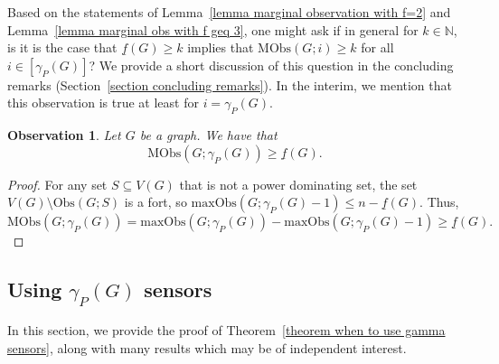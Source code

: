 \documentclass{article}
\newtheorem{observation}[theorem]{Observation}
\begin{document}
        Based on the statements of Lemma~\ref{lemma marginal observation with f=2} and Lemma~\ref{lemma marginal obs with f geq 3}, one might ask if in general for $k\in\mathbb{N}$, is it is the case that $\underline{f}(G)\geq k$ implies that $\mathrm{MObs}(G;i)\geq k$ for all $i\in [\gamma_P(G)]$?
        We provide a short discussion of this question in the concluding remarks (Section~\ref{section concluding remarks}).
        In the interim, we mention that this observation is true at least for $i=\gamma_P(G)$.
        \begin{observation}\label{observation marginal obs for gamma is minimal fort}
            Let $G$ be a graph.
            We have that
                \[ \mathrm{MObs}(G;\gamma_P(G))\geq \underline{f}(G). \]
        \end{observation}
        \begin{proof}
            For any set $S\subseteq V(G)$ that is not a power dominating set, the set $V(G)\setminus \mathrm{Obs}(G;S)$ is a fort, so $\mathrm{maxObs}(G;\gamma_P(G)-1)\leq n-\underline{f}(G)$.
            Thus,
                \[ \mathrm{MObs}(G;\gamma_P(G))=\mathrm{maxObs}(G;\gamma_P(G))-\mathrm{maxObs}(G;\gamma_P(G)-1)\geq \underline{f}(G). \]
        \end{proof}
    
    \subsection{Using \texorpdfstring{$\gamma_P(G)$}{the power domination number of} sensors}\label{subsection using gamma sensors}
        In this section, we provide the proof of Theorem~\ref{theorem when to use gamma sensors}, along with many results which may be of independent interest.
        
\end{document}
